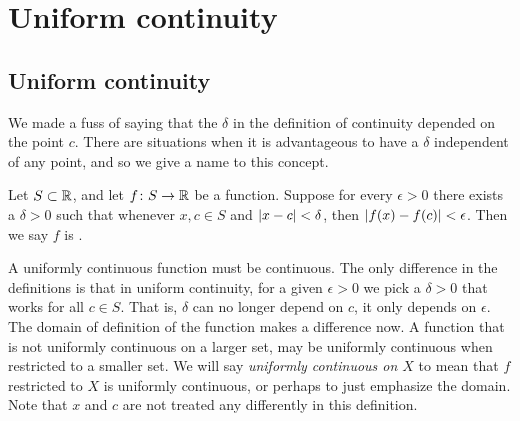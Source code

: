 
\sectionnewpage
\section{Uniform continuity}
\label{sec:unifcont}


\subsection{Uniform continuity}

We made a fuss of saying that the $\delta$ in the definition of
continuity depended on the point $c$.  There are situations when it is
advantageous to have a $\delta$ independent of any point, and so we
give a name to this concept.

\begin{defn}
Let $S \subset {\mathbb{R}}$, and let $f \colon S \to {\mathbb{R}}$ be a function.
Suppose for every $\epsilon > 0$ there exists a $\delta > 0$
such that whenever $x, c \in S$ and
$\left\lvert {x-c} \right\rvert < \delta$, then $\left\lvert {f(x)-f(c)} \right\rvert < \epsilon$.
Then we say $f$ is \emph{}.
\end{defn}

A uniformly continuous function must be continuous.
The only difference in the definitions
is that in uniform continuity,
for a given $\epsilon > 0$ we pick a $\delta > 0$ that
works for all $c \in S$.  That is, $\delta$ can no longer depend on $c$,
it only depends on $\epsilon$.  The domain of definition
of the function makes a difference now.  A function that is not uniformly
continuous on a larger set, may be uniformly continuous when restricted to a
smaller set.
We will say \emph{uniformly continuous on $X$} to mean that
$f$ restricted to $X$ is uniformly continuous, or perhaps to just emphasize
the domain.
Note that $x$ and $c$ are not treated any differently
in this definition.

